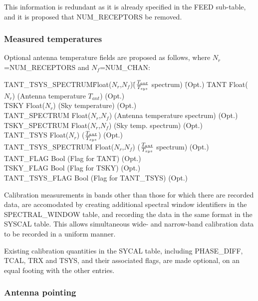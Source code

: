 \documentclass{article}
\newcommand{\nr}{$N_r$}
\newcommand{\nf}{$N_f$}
\begin{document}
This information is redundant as it is already specified in the FEED
sub-table, and it is proposed that NUM\_RECEPTORS be removed.

\subsubsection{Measured temperatures}

Optional antenna temperature fields are proposed as follows, where
\nr=NUM\_RECEPTORS and \nf=NUM\_CHAN:

\begin{tabbing}
TANT\_TSYS\_SPECTRUM\quad\quad \= Float(\nr,\nf)\quad\quad \=
(${{T_{ant}}\over{T_{sys}}}$ spectrum)
\quad\quad\quad\quad\quad\quad\quad\quad\quad 
\= (Opt.) \kill
TANT \> Float(\nr) \> (Antenna temperature $T_{ant}$) \> (Opt.) \\
TSKY \> Float(\nr) \> (Sky temperature) \> (Opt.) \\
TANT\_SPECTRUM   \> Float(\nr,\nf)  \> 
(Antenna temperature spectrum) \> (Opt.) \\
TSKY\_SPECTRUM \> Float(\nr,\nf) \> (Sky temp. spectrum) \> (Opt.) \\
TANT\_TSYS     \> Float(\nr) \>
(${{T_{ant}}\over{T_{sys}}}$) \> (Opt.) \\
TANT\_TSYS\_SPECTRUM     \> Float(\nr,\nf) \>
(${{T_{ant}}\over{T_{sys}}}$ spectrum) \> (Opt.) \\
TANT\_FLAG     \> Bool \>
(Flag for TANT) \> (Opt.) \\
TSKY\_FLAG \> Bool \> (Flag for TSKY) \> (Opt.) \\
TANT\_TSYS\_FLAG     \> Bool \>
(Flag for TANT\_TSYS) \> (Opt.) \\
\end{tabbing}

 Calibration measurements in bands other than those for which there
are recorded data, are accomodated by creating additional spectral
window identifiers in the SPECTRAL\_WINDOW table, and recording the
data in the same format in the SYSCAL table. This allows simultaneous
wide- and narrow-band calibration data to be recorded in a uniform manner.

 Existing calibration quantities in the SYCAL table, including
PHASE\_DIFF, TCAL, TRX and TSYS, and their associated flags, are made
optional, on an equal footing with the other entries.


\subsubsection{Antenna pointing}
\end{document}
